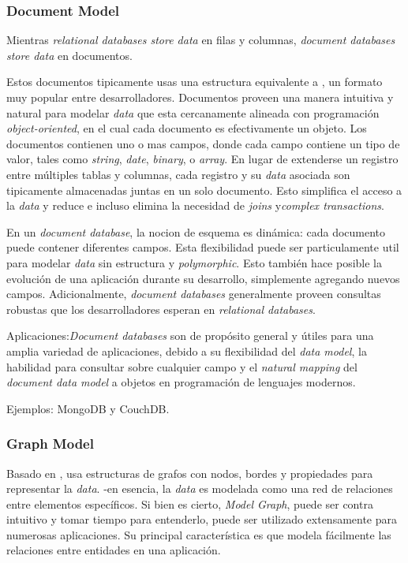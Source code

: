 \subsubsection*{Document Model}\label{cap:estadoArte:tecnologias:nosql:document_model}
 Mientras \textit{relational databases store data} en filas y columnas, \textit{document databases store data} en documentos.  

Estos documentos tipicamente usas una estructura equivalente a , un formato muy popular entre desarrolladores. Documentos proveen una manera intuitiva y natural para modelar \textit{data} que esta cercanamente alineada con  programación \textit{object-oriented}, en el cual cada documento es efectivamente un objeto. Los documentos contienen uno o mas campos, donde cada campo contiene un tipo de valor, tales como \textit{string}, \textit{date}, \textit{binary}, o \textit{array}. En lugar de extenderse un registro entre múltiples tablas y columnas, cada registro y su \textit{data} asociada son tipicamente almacenadas juntas en un solo documento. Esto simplifica el acceso a la \textit{data} y reduce e incluso elimina la necesidad de \textit{joins} y\textit{complex transactions}.

En un \textit{document database}, la nocion de esquema es dinámica: cada documento puede contener diferentes campos. Esta flexibilidad puede ser particulamente util para modelar \textit{data} sin estructura y \textit{polymorphic}. Esto también hace posible la evolución de una aplicación durante su desarrollo, simplemente agregando nuevos campos. Adicionalmente, \textit{document databases} generalmente proveen consultas robustas que los desarrolladores esperan en \textit{relational databases}.

Aplicaciones:\textit{Document databases} son de propósito general y útiles para una amplia variedad de aplicaciones, debido a su flexibilidad del \textit{data model}, la habilidad para consultar sobre cualquier campo y el \textit{natural mapping} del \textit{document data model} a objetos en programación de lenguajes modernos.

Ejemplos: MongoDB y CouchDB.

\subsubsection*{Graph Model}

Basado en , usa estructuras de grafos con nodos, bordes y propiedades para representar la \textit{data}. -en esencia, la \textit{data} es modelada como una red de relaciones entre elementos específicos. Si bien es cierto, \textit{Model Graph}, puede ser contra intuitivo y tomar tiempo para entenderlo, puede ser utilizado extensamente para numerosas aplicaciones. Su principal característica es que modela fácilmente las relaciones entre entidades en una aplicación.


